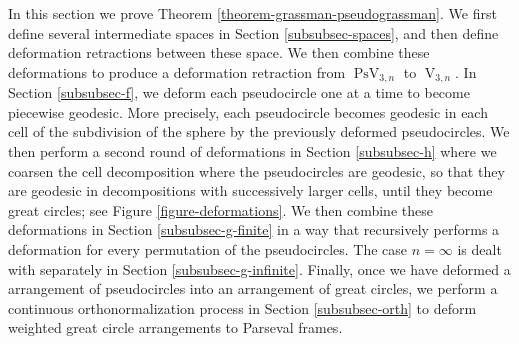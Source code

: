 \documentclass[11pt]{article}
\numberwithin{equation}{section}
\theoremstyle{remark}
\DeclareMathOperator{\stief}{V}
\DeclareMathOperator{\pstief}{PsV}
\begin{document}
In this section we prove Theorem \ref{theorem-grassman-pseudograssman}.
We first define several intermediate spaces in Section \ref{subsubsec-spaces}, and then define deformation retractions between these space. We then combine these deformations to produce a deformation retraction from $\pstief_{3,n}$ to $\stief_{3,n}$.
In Section \ref{subsubsec-f}, we deform each pseudocircle one at a time to become piecewise geodesic. More precisely, each pseudocircle becomes geodesic in each cell of the subdivision of the sphere by the previously deformed pseudocircles. We then perform a second round of deformations in Section \ref{subsubsec-h} where we coarsen the cell decomposition where the pseudocircles are geodesic, so that they are geodesic in decompositions with successively larger cells, until they become great circles; see Figure \ref{figure-deformations}. We then combine these deformations in Section \ref{subsubsec-g-finite} in a way that recursively performs a deformation for every permutation of the pseudocircles. The case $n=\infty$ is dealt with separately in Section \ref{subsubsec-g-infinite}. Finally, once we have deformed a arrangement of pseudocircles into an arrangement of great circles, we perform a continuous orthonormalization process in Section \ref{subsubsec-orth} to deform weighted great circle arrangements to Parseval frames.
\end{document}
